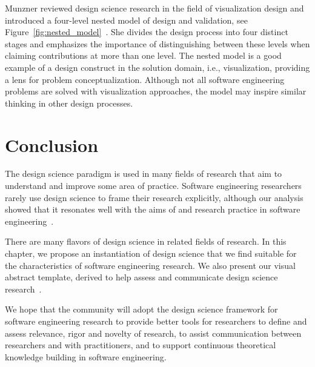 \documentclass[graybox]{svmult}
\newcommand{\peggy}[1]{\textcolor{blue}{{\it [Peggy says: #1]}}}
\newcommand{\peggy}[1]{}
\begin{document}
Munzner reviewed design science research in the field of visualization design and introduced a four-level nested model of design and validation, see Figure~\ref{fig:nested_model}~\cite{munzner2009}. She divides the design process into four distinct stages and emphasizes the importance of distinguishing between these levels when claiming contributions at more than one level. The nested model is a good example of a design construct in the solution domain, i.e., visualization, providing a lens for problem conceptualization. Although not all software engineering problems are solved with visualization approaches, the model may inspire similar thinking in other design processes. 


\section{Conclusion}
\label{sec:conclusion}
The design science paradigm is used in many fields of research that aim to understand and improve some area of practice. Software engineering researchers rarely use design science to frame their research explicitly, although our analysis showed that it resonates well with the aims of and research practice in software engineering~\cite{Engstrom19arxiv}. 

There are many flavors of design science in related fields of research. In this chapter, we propose an instantiation %
of design science that we find suitable for the characteristics of software engineering research. We also present our visual abstract template, derived to help assess and communicate design science research~\cite{StoreyESEM17}. 

We hope that the community will adopt the design science framework for software engineering research to provide better tools for researchers to define and assess relevance, rigor and novelty of research, to assist communication between researchers and with practitioners, and to support continuous theoretical knowledge building in software engineering. 




\end{document}

